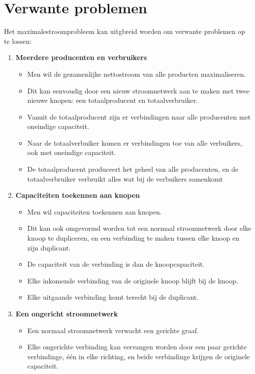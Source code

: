 \section{Verwante problemen}
Het maximalestroomprobleem kan uitgbreid worden om verwante problemen op te lossen:
\begin{enumerate}
    \item \textbf{Meerdere producenten en verbruikers}
    \begin{itemize}
        \item Men wil de gezamenlijke nettostroom van alle producten maximaliseren.
        \item Dit kan eenvoudig door een nieuw stroomnetwerk aan te maken met twee nieuwe knopen: een totaalproducent en totaalverbruiker.
        \item Vanuit de totaalproducent zijn er verbindingen naar alle producenten met oneindige capaciteit.
        \item Naar de totaalverbuiker komen er verbindingen toe van alle verbuikers, ook met oneindige capaciteit.
        \item De totaalproducent produceert het geheel van alle producenten, en de totaalverbruiker verbruikt alles wat bij de verbuikers samenkomt
    \end{itemize}
    \item \textbf{Capaciteiten toekennen aan knopen}
    \begin{itemize}
        \item Men wil capaciteiten toekennen aan knopen.
        \item Dit kan ook omgevormd worden tot een normaal stroomnetwerk door elke knoop te dupliceren, en een verbinding te maken tussen elke knoop en zijn duplicant.
        \item De capaciteit van de verbinding is dan de knoopcapaciteit.
        \item Elke inkomende verbinding van de originele knoop blijft bij de knoop.
        \item Elke uitgaande verbinding komt terecht bij de duplicant.
    \end{itemize}
    \item \textbf{Een ongericht stroomnetwerk}
    \begin{itemize}
        \item Een normaal stroomnetwerk verwacht een gerichte graaf.
        \item Elke ongerichte verbinding kan vervangen worden door een paar gerichte verbindinge, één in elke richting, en beide verbindinge krijgen de originele capaciteit.

\end{itemize}
\end{enumerate}
